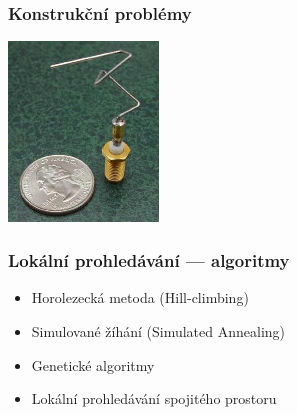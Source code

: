 \documentclass[red,professionalfont]{beamer}
\theoremstyle{definition}
\newcommand{\0}{\mbox{${\bf 0}$}}
\begin{document}
\begin{frame}\frametitle{Konstrukční problémy}
\begin{center}
\includegraphics[width=4cm]{St_5-xband-antenna.jpg}
\end{center}
\end{frame}


\begin{frame}\frametitle{Lokální prohledávání --- algoritmy}

\begin{itemize}
 \item Horolezecká metoda (Hill-climbing)\pause
 \item Simulované žíhání (Simulated Annealing)\pause
 \item Genetické algoritmy\pause
 \item Lokální prohledávání spojitého prostoru
\end{itemize}
\end{frame}
\end{document}
